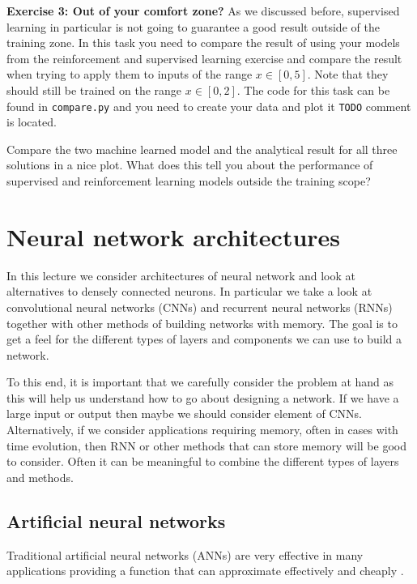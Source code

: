 \documentclass[12pt,a4paper]{article} %
\numberwithin{equation}{section}
\begin{document}
		\textbf{Exercise 3: Out of your comfort zone?}\newline
			As we discussed before, supervised learning in particular is not going to guarantee a good result outside of the training zone. In this task you need to compare the result of using your models from the reinforcement and supervised learning exercise and compare the result when trying to apply them to inputs of the range $x \in [0,5]$. Note that they should still be trained on the range $x \in [0,2]$. The code for this task can be found in \texttt{compare.py} and you need to create your data and plot it \texttt{TODO} comment is located.
			
			Compare the two machine learned model and the analytical result for all three solutions in a nice plot. What does this tell you about the performance of supervised and reinforcement learning models outside the training scope?
		
\section{Neural network architectures}\label{sec:lecture3}
	In this lecture we consider architectures of neural network and look at alternatives to densely connected neurons. In particular we take a look at convolutional neural networks (CNNs) and recurrent neural networks (RNNs) together with other methods of building networks with memory. The goal is to get a feel for the different types of layers and components we can use to build a network. 
	
	To this end, it is important that we carefully consider the problem at hand as this will help us understand how to go about designing a network. If we have a large input or output then maybe we should consider element of CNNs. Alternatively, if we consider applications requiring memory, often in cases with time evolution, then RNN or other methods that can store memory will be good to consider. Often it can be meaningful to combine the different types of layers and methods.
	
	\subsection{Artificial neural networks}
		Traditional artificial neural networks (ANNs) are very effective in many applications providing a function that can approximate effectively and cheaply \cite{lin:2017}. 
		
\end{document}

